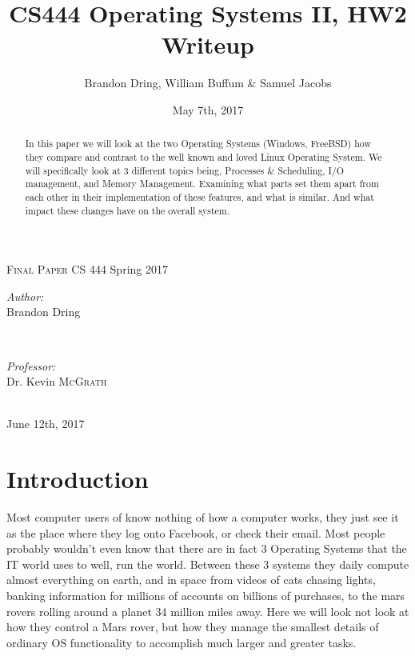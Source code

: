 \documentclass{article}
\title{CS444 Operating Systems II, HW2 Writeup}
\author{Brandon Dring, William Buffum \& Samuel Jacobs}
\date{May 7th, 2017}
\begin{document}
\begin{titlepage}
\center

\textsc{\LARGE \hspace{28mm} Final Paper} \newline \newline\newline\newline\newline
{\large CS 444 Spring 2017}



\begin{minipage}{0.4\textwidth}
   \begin{flushleft} \large
      \emph{Author:}\\
      Brandon Dring \\
   \end{flushleft}
\end{minipage}
~
\begin{minipage}{0.4\textwidth}
   \begin{flushright} \large
      \emph{Professor:} \\
      Dr. Kevin \textsc{McGrath} %
   \end{flushright}
\end{minipage} \\ [4cm]

{\large June 12th, 2017}
\vfill %

\begin{abstract}
	In this paper we will look at the two Operating Systems (Windows, FreeBSD) how they compare and contrast to the well known and loved Linux Operating System. We will specifically look at 3 different topics being, Processes \& Scheduling, I/O management, and Memory Management. Examining what parts set them apart from each other in their implementation of these features, and what is similar. And what impact these changes have on the overall system.
\end{abstract}

\pagebreak

\end{titlepage}
\newpage


\part{Introduction}
    Most computer users of know nothing of how a computer works, they just see it as the place where they log onto Facebook, or check their email. Most people probably wouldn’t even know that there are in fact 3 Operating Systems that the IT world uses to well, run the world. Between these 3 systems they daily compute almost everything on earth, and in space from videos of cats chasing lights, banking information for millions of accounts on billions of purchases, to the mars rovers rolling around a planet 34 million miles away. Here we will look not look at how they control a Mars rover, but how they manage the smallest details of ordinary OS functionality to accomplish much larger and greater tasks.
\end{document}
